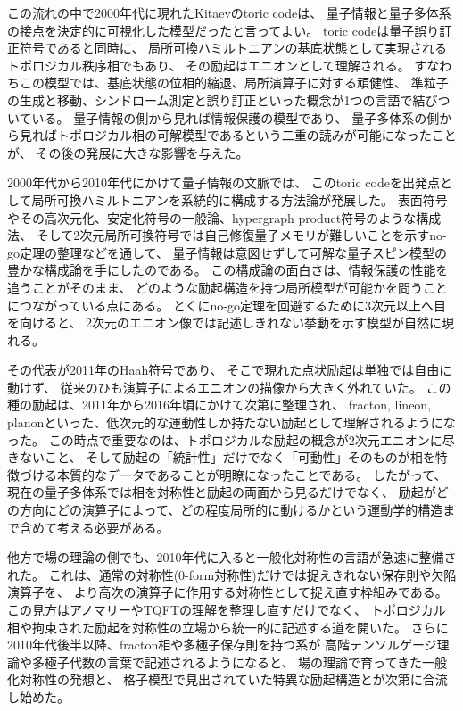 \documentclass[../master.tex]{subfiles}
\begin{document}
この流れの中で2000年代に現れたKitaevのtoric codeは、
量子情報と量子多体系の接点を決定的に可視化した模型だったと言ってよい。
toric codeは量子誤り訂正符号であると同時に、
局所可換ハミルトニアンの基底状態として実現されるトポロジカル秩序相でもあり、
その励起はエニオンとして理解される。
すなわちこの模型では、基底状態の位相的縮退、局所演算子に対する頑健性、
準粒子の生成と移動、シンドローム測定と誤り訂正といった概念が1つの言語で結びついている。
量子情報の側から見れば情報保護の模型であり、
量子多体系の側から見ればトポロジカル相の可解模型であるという二重の読みが可能になったことが、
その後の発展に大きな影響を与えた。

2000年代から2010年代にかけて量子情報の文脈では、
このtoric codeを出発点として局所可換ハミルトニアンを系統的に構成する方法論が発展した。
表面符号やその高次元化、安定化符号の一般論、hypergraph product符号のような構成法、
そして2次元局所可換符号では自己修復量子メモリが難しいことを示すno-go定理の整理などを通して、
量子情報は意図せずして可解な量子スピン模型の豊かな構成論を手にしたのである。
この構成論の面白さは、情報保護の性能を追うことがそのまま、
どのような励起構造を持つ局所模型が可能かを問うことにつながっている点にある。
とくにno-go定理を回避するために3次元以上へ目を向けると、
2次元のエニオン像では記述しきれない挙動を示す模型が自然に現れる。

その代表が2011年のHaah符号であり、
そこで現れた点状励起は単独では自由に動けず、
従来のひも演算子によるエニオンの描像から大きく外れていた。
この種の励起は、2011年から2016年頃にかけて次第に整理され、
fracton, lineon, planonといった、低次元的な運動性しか持たない励起として理解されるようになった。
この時点で重要なのは、トポロジカルな励起の概念が2次元エニオンに尽きないこと、
そして励起の「統計性」だけでなく「可動性」そのものが相を特徴づける本質的なデータであることが明瞭になったことである。
したがって、現在の量子多体系では相を対称性と励起の両面から見るだけでなく、
励起がどの方向にどの演算子によって、どの程度局所的に動けるかという運動学的構造まで含めて考える必要がある。

他方で場の理論の側でも、2010年代に入ると一般化対称性の言語が急速に整備された。
これは、通常の対称性(0-form対称性)だけでは捉えきれない保存則や欠陥演算子を、
より高次の演算子に作用する対称性として捉え直す枠組みである。
この見方はアノマリーやTQFTの理解を整理し直すだけでなく、
トポロジカル相や拘束された励起を対称性の立場から統一的に記述する道を開いた。
さらに2010年代後半以降、fracton相や多極子保存則を持つ系が
高階テンソルゲージ理論や多極子代数の言葉で記述されるようになると、
場の理論で育ってきた一般化対称性の発想と、
格子模型で見出されていた特異な励起構造とが次第に合流し始めた。
\end{document}
